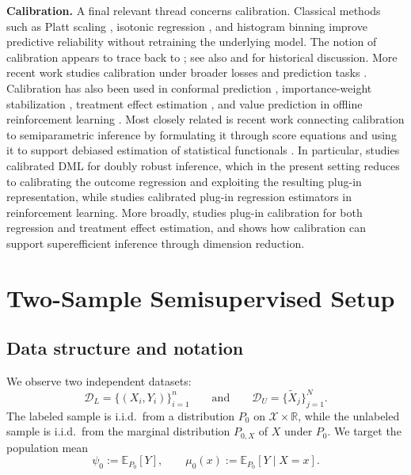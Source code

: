 \documentclass{article}
\theoremstyle{plain}
\theoremstyle{definition}
\newcommand{\E}{\mathbb{E}}
\newcommand{\R}{\mathbb{R}}
\newcommand{\1}{\mathbbm{1}}
\newcommand{\muzero}{\mu_0}
\newcommand{\Px}{P_{0,X}}
\begin{document}
\textbf{Calibration.} A final relevant thread concerns calibration. Classical methods such as Platt scaling \citep{platt1999probabilistic,cox1958two}, isotonic regression \citep{zadrozny2002transforming,niculescu2005predicting}, and histogram binning \citep{zadrozny2001obtaining} improve predictive reliability without retraining the underlying model. The notion of calibration appears to trace back to \citet{mincer1969evaluation}; see also \citet{lichtenstein1977calibration} and \citet{lee2023t} for historical discussion. More recent work studies calibration under broader losses and prediction tasks \citep{noarov2023statistical,van2023causal,whitehouse2024orthogonal,van2025venn}. Calibration has also been used in conformal prediction \citep{van2024self,van2025venn}, importance-weight stabilization \citep{van2024stabilized}, treatment effect estimation \citep{chernozhukov2018generic,van2023causal,whitehouse2024orthogonal}, and value prediction in offline reinforcement learning \citep{van2025bellman}. Most closely related is recent work connecting calibration to semiparametric inference by formulating it through score equations and using it to support debiased estimation of statistical functionals \citep{van2024automatic,van2023adaptive,van2025semiparametric}. In particular, \citet{van2024automatic} studies calibrated DML for doubly robust inference, which in the present setting reduces to calibrating the outcome regression and exploiting the resulting plug-in representation, while \citet{van2025semiparametric} studies calibrated plug-in regression estimators in reinforcement learning. More broadly, \citet{van2023adaptive} studies plug-in calibration for both regression and treatment effect estimation, and shows how calibration can support superefficient inference through dimension reduction.

 
 
 

\section{Two-Sample Semisupervised Setup}
 \label{sec:setup}
\subsection{Data structure and notation}
We observe two independent datasets:
\[
\mathcal D_L=\{(X_i,Y_i)\}_{i=1}^n
\qquad\text{and}\qquad
\mathcal D_U=\{\widetilde X_j\}_{j=1}^N.
\]
The labeled sample is i.i.d.\ from a distribution \(P_0\) on \(\mathcal X \times \R\), while the unlabeled sample is i.i.d.\ from the marginal distribution \(\Px\) of \(X\) under \(P_0\). We target the population mean
\[
\psi_0 := \E_{P_0}[Y],
\qquad
\muzero(x):=\E_{P_0}[Y \mid X=x].
\]
\end{document}
